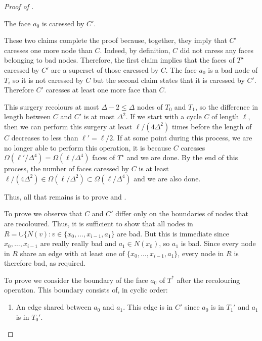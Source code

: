 \documentclass{patmorin}
\newcommand{\dual}[1]{{#1}^\star}
\begin{document}
\begin{proof}[Proof of ]
\begin{enumerate}
   \begin{clm}
      The face $a_0$ is caressed by $C'$.
   \end{clm}

   These two claims complete the proof because, together,
   they imply that $C'$ caresses one more node than $C$.  Indeed, by
   definition, $C$ did not caress any faces belonging to bad nodes.
   Therefore, the first claim implies that the faces of $\dual{T}$
   caressed by $C'$ are a superset of those caressed by $C$.  The face
   $a_0$ is a bad node of $T_i$ so it is not caressed by $C$ but the
   second claim states that it is caressed by $C'$.  Therefore $C'$
   caresses at least one more face than $C$.

   This surgery recolours at most $\Delta-2\le \Delta$ nodes of $T_0$
   and $T_1$, so the difference in length between $C$ and $C'$
   is at most $\Delta^2$.  If we start with a cycle $C$
   of length $\ell$, then we can perform this surgery at least
   $\ell/(4\Delta^2)$ times before the length of $C$ decreases
   to less than $\ell'=\ell/2$. If at some point during this process,
   we are no longer able to perform this operation, it is because
   $C$ caresses $\Omega(\ell'/\Delta^4)=\Omega(\ell/\Delta^4)$
   faces of $\dual{T}$ and we are done.  By the end of this
   process, the number of faces caressed by $C$ is at least
   $\ell/(4\Delta^2)\in\Omega(\ell/\Delta^2)\subset\Omega(\ell/\Delta^4)$
   and we are also done.

   Thus, all that remains is to prove  and
   .

   To prove  we observe that $C$ and $C'$ differ only on
   the boundaries of nodes that are recoloured.  Thus, it is sufficient
   to show that all nodes in $R=\cup\{N(v): v\in\{x_0,\ldots,x_{i-1},a_1\}$
   are bad.  But this is immediate since $x_0,\ldots,x_{i-1}$ are really
   really bad and $a_1\in N(x_0)$, so $a_1$ is bad.  Since every node in $R$
   share an edge with at least one of $\{x_0,\ldots,x_{i-1},a_1\}$, every
   node in $R$ is therefore bad, as required.

   To prove  we consider the boundary of the face
   $a_0$ of $T^*$ after the recolouring operation.  This boundary
   consists of, in cyclic order:
   \begin{enumerate}
     \item  An edge shared between $a_0$ and $a_1$.  This edge is in
       $C'$ since $a_0$ is in $T_1'$ and $a_1$ is in $T_0'$.


\end{enumerate}
\end{enumerate}
\end{proof}
\end{document}
